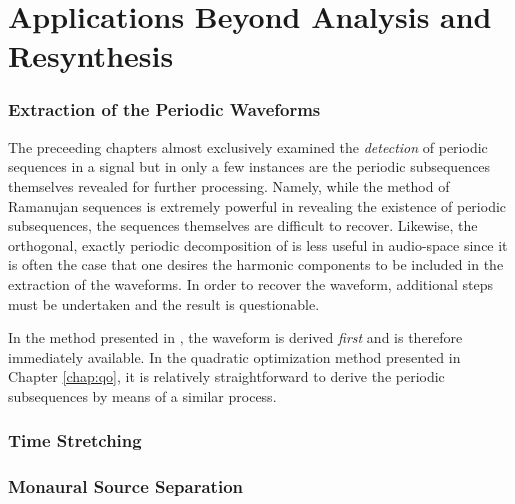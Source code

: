 \chapter{Applications Beyond Analysis and Resynthesis}



\subsection{Extraction of the Periodic Waveforms}
The preceeding chapters almost exclusively examined the \emph{detection} of periodic sequences in a signal but in only a few instances are the periodic subsequences themselves revealed for further processing. Namely, while the method of Ramanujan sequences is extremely powerful in revealing the existence of periodic subsequences, the sequences themselves are difficult to recover.
Likewise, the orthogonal, exactly periodic decomposition of \cite{muresan2003orthogonal} is less useful in audio-space since it is often the case that one desires the harmonic components to be included in the extraction of the waveforms. In order to recover the waveform, additional steps must be undertaken and the result is questionable.

In the method presented in \cite{sethares1999periodicity}, the waveform is derived \emph{first} and is therefore immediately available. In the quadratic optimization method presented in Chapter \ref{chap:qo}, it is relatively straightforward to derive the periodic subsequences by means of a similar process.

\subsection{Time Stretching}

\subsection{Monaural Source Separation}
